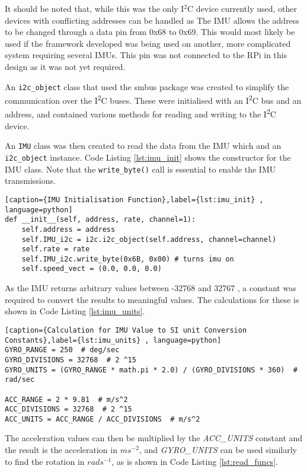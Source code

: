It should be noted that, while this was the only I$^2$C device currently used, other devices with conflicting addresses can be handled as The IMU allows the address to be changed through a data pin from 0x68 to 0x69. This would most likely be used if the framework developed was being used on another, more complicated system requiring several IMUs. This pin was not connected to the RPi in this design as it was not yet required. 

An \verb|i2c_object| class that used the smbus package was created to simplify the communication over the I\textsuperscript{2}C buses. These were initialised with an I\textsuperscript{2}C bus and an address, and contained various methods for reading and writing to the I\textsuperscript{2}C device. 


An \verb|IMU| class was then created to read the data from the IMU which and an \verb|i2c_object| instance. Code Listing \ref{lst:imu_init} shows the constructor for the IMU class. Note that the \verb|write_byte()| call is essential to enable the IMU transmissions. 

\begin{lstlisting}[caption={IMU Initialisation Function},label={lst:imu_init} , language=python]
def __init__(self, address, rate, channel=1):
    self.address = address
    self.IMU_i2c = i2c.i2c_object(self.address, channel=channel)
    self.rate = rate
    self.IMU_i2c.write_byte(0x6B, 0x00) # turns imu on
    self.speed_vect = (0.0, 0.0, 0.0)
\end{lstlisting}

As the IMU returns arbitrary values between -32768 and 32767 , a constant was required to convert the results to meaningful values. The calculations for these is shown in Code Listing \ref{lst:imu_units}. 

\begin{lstlisting}[caption={Calculation for IMU Value to SI unit Conversion Constants},label={lst:imu_units} , language=python]
GYRO_RANGE = 250  # deg/sec
GYRO_DIVISIONS = 32768  # 2 ^15
GYRO_UNITS = (GYRO_RANGE * math.pi * 2.0) / (GYRO_DIVISIONS * 360)  # rad/sec

ACC_RANGE = 2 * 9.81  # m/s^2
ACC_DIVISIONS = 32768  # 2 ^15
ACC_UNITS = ACC_RANGE / ACC_DIVISIONS  # m/s^2
\end{lstlisting}

The acceleration values can then be multiplied by the \textit{ACC\_UNITS} constant and the result is the acceleration in $ms^{-2}$, and \textit{GYRO\_UNITS} can be used similarly to find the rotation in $rads^{-1}$, as is shown in Code Listing \ref{lst:read_funcs}. 


